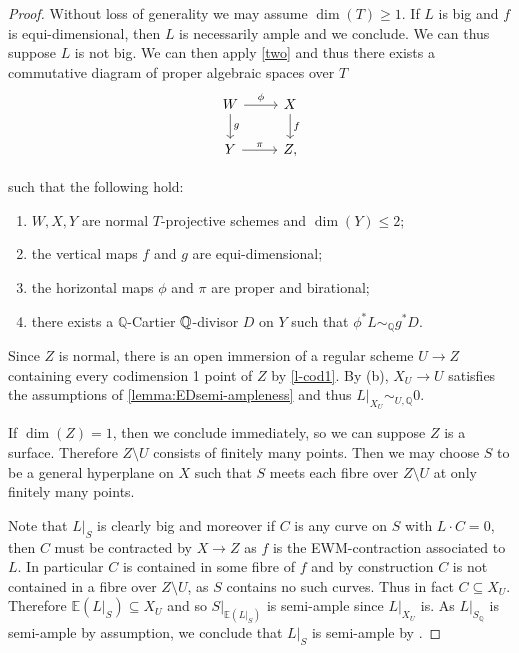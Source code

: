\begin{proof}
	Without loss of generality we may assume $\dim(T)\geq 1$. If $L$ is big and $f$ is equi-dimensional, then $L$ is necessarily ample and we conclude.
	We can thus suppose $L$ is not big. We can then apply \autoref{two} and thus there exists a commutative diagram of proper algebraic spaces over $T$
	\[\begin{tikzcd}
	W \arrow[d, "g"] \arrow[r, "\phi"] & X \arrow[d, "f"] \\
	Y \arrow[r, "\pi"]             & Z  ,                
	\end{tikzcd}\]
	
	such that the following hold:
	
	\begin{enumerate}
		\item $W,X,Y$ are normal $T$-projective schemes and $\dim (Y) \leq 2$;
		\item the vertical maps $f$ and $g$ are equi-dimensional;
		\item the horizontal maps $\phi$ and $\pi$ are proper and birational;
		\item there exists a $\mathbb{Q}$-Cartier $\mathbb{Q}$-divisor $D$ on $Y$ such that $\phi^{*}L \sim_{\mathbb{Q}} g^{*}D$.
	\end{enumerate}
	
	Since $Z$ is normal, there is an open immersion of a regular scheme $U \to Z$ containing every codimension 1 point of $Z$ by \autoref{l-cod1}.
	By (b), $X_{U} \to U$ satisfies the assumptions of \autoref{lemma:EDsemi-ampleness} and thus $L|_{X_{U}} \sim_{U,\mathbb{Q}} 0$. 
	
	If $\dim(Z)=1$, then we conclude immediately, so we can suppose $Z$ is a surface. Therefore $Z \setminus U$ consists of finitely many points.  
	Then we may choose $S$ to be a general hyperplane on $X$ such that $S$ meets each fibre over $Z \setminus U$ at only finitely many points. 
	
	Note that $L|_{S}$ is clearly big and moreover if $C$ is any curve on $S$ with $L \cdot C =0$, then $C$ must be contracted by $X \to Z$ as $f$ is the EWM-contraction associated to $L$. In particular $C$ is contained in some fibre of $f$ and by construction $C$ is not contained in a fibre over $Z \setminus U$, as $S$ contains no such curves. Thus in fact $C \subseteq X_{U}$. Therefore $\mathbb{E}(L|_{S}) \subseteq X_{U}$ and so $S|_{\mathbb{E}(L|_{S})}$ is semi-ample since $L|_{X_{U}}$ is. As $L|_{S_{\mathbb{Q}}}$ is semi-ample by assumption, we conclude that $L|_{S}$ is semi-ample by \cite[Theorem 6.1]{witaszek2020keels}. 
	

\end{proof}
